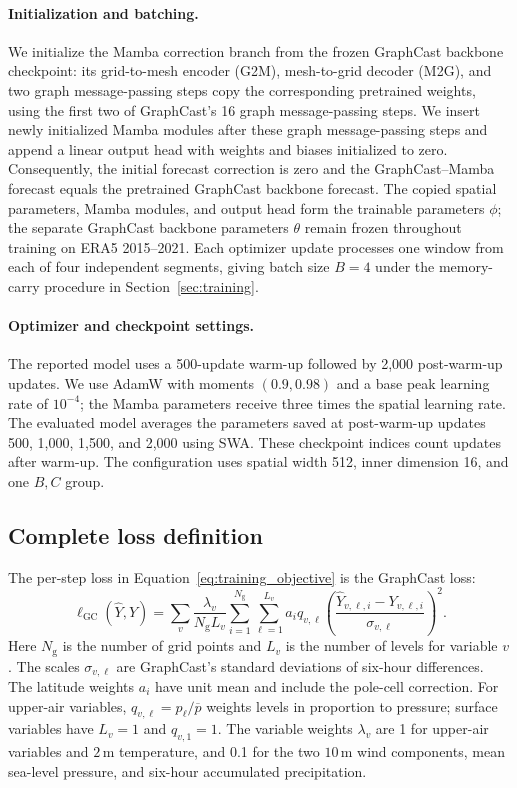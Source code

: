 \documentclass{article}
\begin{document}
\paragraph{Initialization and batching.}
We initialize the Mamba correction branch from the frozen GraphCast backbone checkpoint: its grid-to-mesh encoder (G2M), mesh-to-grid decoder (M2G), and two graph message-passing steps copy the corresponding pretrained weights, using the first two of GraphCast's 16 graph message-passing steps. We insert newly initialized Mamba modules after these graph message-passing steps and append a linear output head with weights and biases initialized to zero. Consequently, the initial forecast correction is zero and the GraphCast--Mamba forecast equals the pretrained GraphCast backbone forecast. The copied spatial parameters, Mamba modules, and output head form the trainable parameters $\phi$; the separate GraphCast backbone parameters $\theta$ remain frozen throughout training on ERA5 2015--2021. Each optimizer update processes one window from each of four independent segments, giving batch size $B=4$ under the memory-carry procedure in Section~\ref{sec:training}.

\paragraph{Optimizer and checkpoint settings.}
The reported model uses a 500-update warm-up followed by 2,000 post-warm-up updates. We use AdamW with moments $(0.9,0.98)$ and a base peak learning rate of $10^{-4}$; the Mamba parameters receive three times the spatial learning rate. The evaluated model averages the parameters saved at post-warm-up updates 500, 1,000, 1,500, and 2,000 using SWA. These checkpoint indices count updates after warm-up. The configuration uses spatial width 512, inner dimension 16, and one $B,C$ group.

\subsection{Complete loss definition}
\label{app:training_loss}
The per-step loss in Equation~\ref{eq:training_objective} is the {GraphCast loss}:
\begin{equation}
    \ell_{\mathrm{GC}}(\hat{Y},Y)
    =\sum_v\frac{\lambda_v}{N_{\mathrm{g}}L_v}
      \sum_{i=1}^{N_{\mathrm{g}}}\sum_{\ell=1}^{L_v}
      a_i q_{v,\ell}
      \left(\frac{\hat{Y}_{v,\ell,i}-Y_{v,\ell,i}}
      {\sigma_{v,\ell}}\right)^2.
    \label{eq:training_gc_loss}
\end{equation}
Here $N_{\mathrm{g}}$ is the number of grid points and $L_v$ is the number of levels for variable $v$. The scales $\sigma_{v,\ell}$ are GraphCast's standard deviations of six-hour differences. The latitude weights $a_i$ have unit mean and include the pole-cell correction. For upper-air variables, $q_{v,\ell}=p_\ell/\overline{p}$ weights levels in proportion to pressure; surface variables have $L_v=1$ and $q_{v,1}=1$. The variable weights $\lambda_v$ are 1 for upper-air variables and $2$\,m temperature, and 0.1 for the two $10$\,m wind components, mean sea-level pressure, and six-hour accumulated precipitation.
\end{document}
